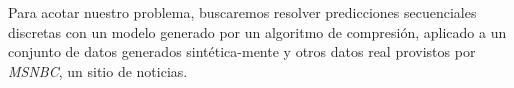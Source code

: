 Para acotar nuestro problema, buscaremos resolver predicciones secuenciales discretas con un modelo generado por un algoritmo de compresión, aplicado a un conjunto de datos generados sintética-mente y otros datos real provistos por \emph{MSNBC}\cite{Claude2014}, un sitio \web de noticias. 


